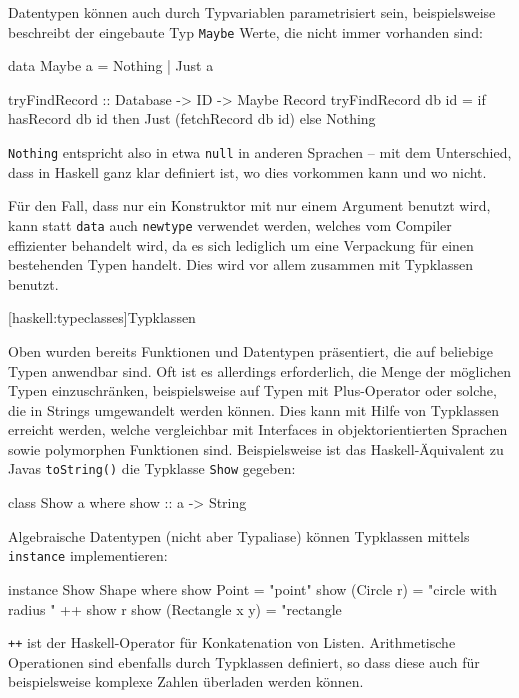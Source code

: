 \documentclass[11pt, a4paper, bibgerm]{scrbook}
\newenvironment{DIFnomarkup}{}{}
\newcommand\icode[1]{\lstinline?#1?}
\newcommand\lsection{}
\begin{document}
Datentypen können auch durch Typvariablen parametrisiert sein,
beispielsweise beschreibt der eingebaute Typ \icode{Maybe} Werte, die
nicht immer vorhanden sind:
\begin{DIFnomarkup}\begin{code}
data Maybe a = Nothing | Just a

tryFindRecord :: Database -> ID -> Maybe Record
tryFindRecord db id = if hasRecord db id
                      then
                        Just (fetchRecord db id)
                      else
                        Nothing
\end{code}\end{DIFnomarkup}
\icode{Nothing} entspricht also in etwa \icode{null} in anderen Sprachen
-- mit dem Unterschied, dass in Haskell ganz klar definiert ist, wo dies
vorkommen kann und wo nicht.

Für den Fall, dass nur ein Konstruktor mit nur einem Argument benutzt
wird, kann statt \icode{data} auch \icode{newtype} verwendet
werden, welches vom Compiler effizienter behandelt wird, da es sich
lediglich um eine Verpackung für einen bestehenden Typen handelt. Dies
wird vor allem zusammen mit Typklassen benutzt.

\lsection[haskell:typeclasses]{Typklassen}

Oben wurden bereits Funktionen und Datentypen präsentiert, die auf
beliebige Typen anwendbar sind. Oft ist es allerdings erforderlich, die
Menge der möglichen Typen einzuschränken, beispielsweise auf Typen mit
Plus-Operator oder solche, die in Strings umgewandelt werden
können. Dies kann mit Hilfe von Typklassen erreicht werden, welche
vergleichbar mit Interfaces in objektorientierten Sprachen sowie
polymorphen Funktionen sind. Beispielsweise ist das Haskell-Äquivalent
zu Javas \icode{toString()} die Typklasse \icode{Show} gegeben:
\begin{DIFnomarkup}\begin{code}
class Show a where
  show :: a -> String
\end{code}\end{DIFnomarkup}
Algebraische Datentypen (nicht aber Typaliase) können Typklassen mittels
\icode{instance} implementieren:
\begin{DIFnomarkup}\begin{code}
instance Show Shape where
  show Point           = "point"
  show (Circle r)      = "circle with radius " ++ show r
  show (Rectangle x y) = "rectangle
\end{code}\end{DIFnomarkup}
\icode{++} ist der Haskell-Operator für Konkatenation von Listen.
Arithmetische Operationen sind ebenfalls durch Typklassen definiert, so
dass diese auch für beispielsweise komplexe Zahlen überladen werden
können.
\end{document}
